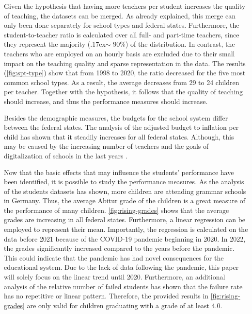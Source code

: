 Given the hypothesis that having more teachers per student increases the quality of teaching, the datasets can be merged. As already explained, this merge can only been done separately for school types and federal states. Furthermore, the student-to-teacher ratio is calculated over all full- and part-time teachers, since they represent the majority ({\raise.17ex\hbox{$\scriptstyle\mathtt{\sim}$}} $90\%$) of the distribution. In contrast, the teachers who are employed on an hourly basis are excluded due to their small impact on the teaching quality and sparse representation in the data. The results (\autoref{fig:spt-type}) show that from 1998 to 2020, the ratio decreased for the five most common school types. As a result, the average decreases from 29 to 24 children per teacher. Together with the hypothesis, it follows that the quality of teaching should increase, and thus the performance measures should increase.

Besides the demographic measures, the budgets for the school system differ between the federal states. The analysis of the adjusted budget to inflation per child has shown that it steadily increases for all federal states. Although, this may be caused by the increasing number of teachers and the goals of digitalization of schools in the last years \cite{cone_pandemic_2022}.


Now that the basic effects that may influence the students' performance have been identified, it is possible to study the performance measures. As the analysis of the students datasets has shown, more children are attending grammar schools in Germany. Thus, the average Abitur grade of the children is a great measure of the performance of many children. \autoref{fig:rising-grades} shows that the average grades are increasing in all federal states. Furthermore, a linear regression can be employed to represent their mean. Importantly, the regression is calculated on the data before 2021 because of the COVID-19 pandemic beginning in 2020. In 2022, the grades significantly increased compared to the years before the pandemic. This could indicate that the pandemic has had novel consequences for the educational system. Due to the lack of data following the pandemic, this paper will solely focus on the linear trend until 2020. Furthermore, an additional analysis of the relative number of failed students has shown that the failure rate has no repetitive or linear pattern. Therefore, the provided results in \autoref{fig:rising-grades} are only valid for children graduating with a grade of at least 4.0.

